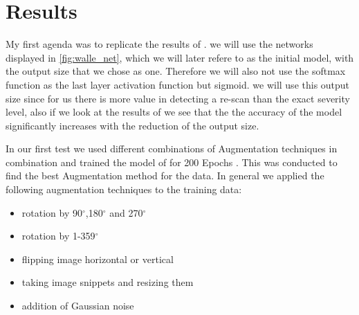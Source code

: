 \documentclass[
a4paper, 
12pt,
grayscalebody, %
abstract=on,
twoside, BCOR10mm, 12pt, DIV13,headinclude, footexclude, final, abstracton, openright
]{ibireprt}
\numberwithin{equation}{chapter}
\numberwithin{table}{chapter}
\numberwithin{figure}{chapter}
\numberwithin{algorithm}{chapter}
\numberwithin{example}{chapter}
\numberwithin{example}{chapter}
\begin{document}
\chapter{Results}


My first agenda was to replicate the results of \cite{Walle2023}. we will use the networks displayed in \ref{fig:walle_net}, which we will later refere to as the initial model, with the output size that we chose as one. Therefore we will also not use the softmax function as the last layer activation function but sigmoid. we will use this output size since for us there is more value in detecting a re-scan than the exact severity level, also if we look at the results of \cite{Walle2023}  we see that the the accuracy of the model significantly increases with the reduction of the output size.

In our first test we used  different combinations of Augmentation techniques in combination and trained the model of \cite{Walle2023} for 200 Epochs . This was conducted to find the best Augmentation method for the data. In general we applied the following augmentation techniques to the training data: 


\begin{itemize}
	\item rotation by 90$^{\circ}$,180$^{\circ}$ and 270$^{\circ}$
	\item rotation by 1-359$^{\circ}$
	\item flipping image horizontal or vertical 
	\item taking image snippets and resizing them 
	\item addition of Gaussian noise 
\end{itemize}
\end{document}
